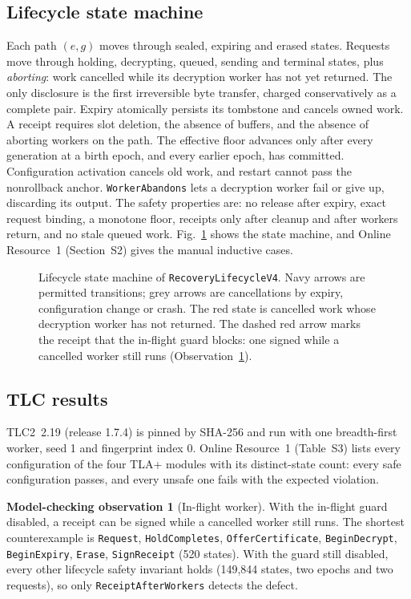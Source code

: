 \documentclass[pdflatex,sn-mathphys-num]{sn-jnl}%
\theoremstyle{plain}
\theoremstyle{definition}
\newtheorem{observation}{Model-checking observation}
\newcommand{\code}[1]{\texttt{#1}}
\begin{document}
\subsection{Lifecycle state machine}
Each path $(e,g)$ moves through sealed, expiring and erased states. Requests move through holding, decrypting, queued, sending and terminal states, plus \emph{aborting}: work cancelled while its decryption worker has not yet returned. The only disclosure is the first irreversible byte transfer, charged conservatively as a complete pair. Expiry atomically persists its tombstone and cancels owned work. A receipt requires slot deletion, the absence of buffers, and the absence of aborting workers on the path. The effective floor advances only after every generation at a birth epoch, and every earlier epoch, has committed. Configuration activation cancels old work, and restart cannot pass the nonrollback anchor. \code{WorkerAbandons} lets a decryption worker fail or give up, discarding its output. The safety properties are: no release after expiry, exact request binding, a monotone floor, receipts only after cleanup and after workers return, and no stale queued work. Fig.~\ref{fig:lifecycle} shows the state machine, and Online Resource~1 (Section~S2) gives the manual inductive cases.

\begin{figure}[t]
\centering
\figbox{}
\caption{Lifecycle state machine of \code{RecoveryLifecycleV4}. Navy arrows are permitted transitions; grey arrows are cancellations by expiry, configuration change or crash. The red state is cancelled work whose decryption worker has not returned. The dashed red arrow marks the receipt that the in-flight guard blocks: one signed while a cancelled worker still runs (Observation~\ref{obs:inflight}).}\label{fig:lifecycle}
\end{figure}

\subsection{TLC results}
TLC2~2.19 (release 1.7.4) is pinned by SHA-256 and run with one breadth-first worker, seed 1 and fingerprint index 0. Online Resource~1 (Table~S3) lists every configuration of the four TLA+ modules with its distinct-state count: every safe configuration passes, and every unsafe one fails with the expected violation.

\begin{observation}[In-flight worker]\label{obs:inflight}
With the in-flight guard disabled, a receipt can be signed while a cancelled worker still runs. The shortest counterexample is \code{Request}, \code{HoldCompletes}, \code{OfferCertificate}, \code{BeginDecrypt}, \code{BeginExpiry}, \code{Erase}, \code{SignReceipt} (520 states). With the guard still disabled, every other lifecycle safety invariant holds (149,844 states, two epochs and two requests), so only \code{ReceiptAfterWorkers} detects the defect.
\end{observation}
\end{document}
